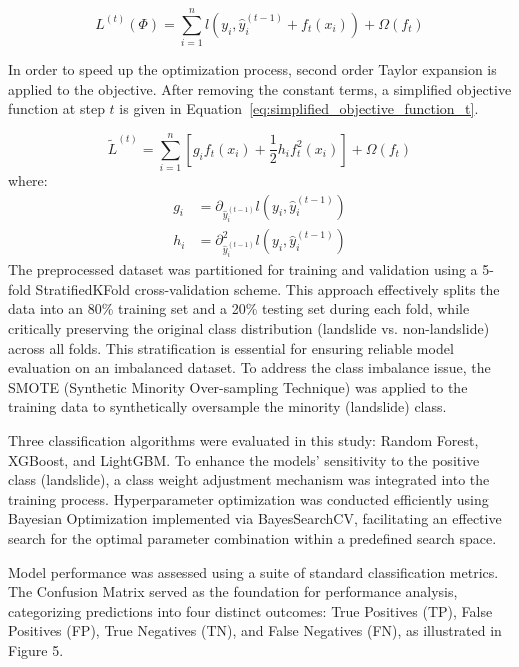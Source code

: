 \begin{equation} \label{eq:objective_function_t}
L^{(t)}(\Phi) = \sum_{i=1}^n l(y_i, \hat{y}_i^{(t-1)} + f_t(x_i)) + \Omega(f_t)
\end{equation}

In order to speed up the optimization process, second order Taylor expansion is applied to the objective. After removing the constant terms, a simplified objective function at step $t$ is given in Equation~\ref{eq:simplified_objective_function_t}.

\begin{equation} \label{eq:simplified_objective_function_t}
\tilde{L}^{(t)} = \sum_{i=1}^n \left[ g_i f_t(x_i) + \frac{1}{2} h_i f_t^2(x_i) \right] + \Omega(f_t)
\end{equation}
where:
\begin{align} \label{eq:g_h_definitions}
g_i &= \partial_{\hat{y}_i^{(t-1)}} l(y_i, \hat{y}_i^{(t-1)}) \\
h_i &= \partial_{\hat{y}_i^{(t-1)}}^2 l(y_i, \hat{y}_i^{(t-1)})
\end{align}
The preprocessed dataset was partitioned for training and validation using a 5-fold StratifiedKFold cross-validation scheme. This approach effectively splits the data into an 80\% training set and a 20\% testing set during each fold, while critically preserving the original class distribution (landslide vs. non-landslide) across all folds. This stratification is essential for ensuring reliable model evaluation on an imbalanced dataset. To address the class imbalance issue, the SMOTE (Synthetic Minority Over-sampling Technique) was applied to the training data to synthetically oversample the minority (landslide) class.

Three classification algorithms were evaluated in this study: Random Forest, XGBoost, and LightGBM. To enhance the models' sensitivity to the positive class (landslide), a class weight adjustment mechanism was integrated into the training process. Hyperparameter optimization was conducted efficiently using Bayesian Optimization implemented via BayesSearchCV, facilitating an effective search for the optimal parameter combination within a predefined search space.

Model performance was assessed using a suite of standard classification metrics. The Confusion Matrix served as the foundation for performance analysis, categorizing predictions into four distinct outcomes: True Positives (TP), False Positives (FP), True Negatives (TN), and False Negatives (FN), as illustrated in Figure 5.

